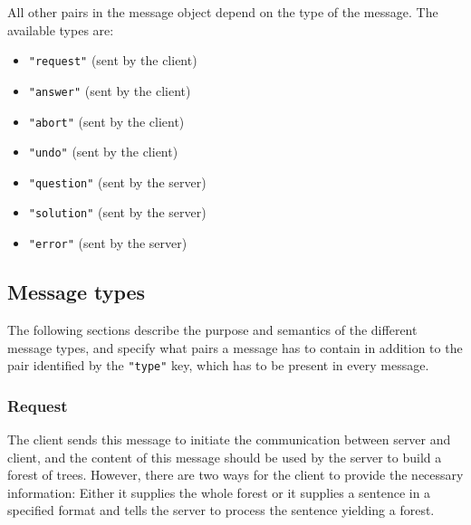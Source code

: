 \documentclass{scrartcl}
\newcommand{\jsstring}[1]{\texttt{\color{OrangeRed}"#1"}}
\begin{document}
All other pairs in the message object depend on the type of the message.
The available types are:

\begin{itemize}
    \item \jsstring{request} (sent by the client)
    \item \jsstring{answer} (sent by the client)
    \item \jsstring{abort} (sent by the client)
    \item \jsstring{undo} (sent by the client)
    \item \jsstring{question} (sent by the server)
    \item \jsstring{solution} (sent by the server)
    \item \jsstring{error} (sent by the server)
\end{itemize}

\subsection{Message types}
\label{sub:Message types}

The following sections describe the purpose and semantics of the different message types,
and specify what pairs a message has to contain in addition to the pair identified by the \jsstring{type} key,
which has to be present in every message.

\subsubsection{Request}
\label{ssub:Request}

The client sends this message to initiate the communication between server and client,
and the content of this message should be used by the server to build a forest of trees.
However, there are two ways for the client to provide the necessary information:
Either it supplies the whole forest or it supplies a sentence in a specified format and tells the server to process the sentence yielding a forest.
\end{document}
